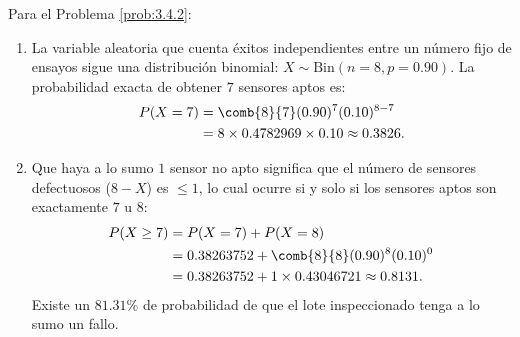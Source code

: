 \begin{solucion}
	\label{sol:3.4.2}
	Para el Problema \ref{prob:3.4.2}:
	\begin{enumerate}
		\item La variable aleatoria que cuenta éxitos independientes entre un número fijo de ensayos sigue una distribución binomial: $X \sim \text{Bin}(n=8, p=0.90)$. La probabilidad exacta de obtener $7$ sensores aptos es:
		\begin{align*}
			P(X = 7) &= \comb{8}{7} (0.90)^7 (0.10)^{8-7} \\
			&= 8 \times 0.4782969 \times 0.10 \approx 0.3826.
		\end{align*}
		\item Que haya a lo sumo $1$ sensor no apto significa que el número de sensores defectuosos ($8-X$) es $\le 1$, lo cual ocurre si y solo si los sensores aptos son exactamente $7$ u $8$:
		\begin{align*}
			P(X \ge 7) &= P(X = 7) + P(X = 8) \\
			&= 0.38263752 + \comb{8}{8} (0.90)^8 (0.10)^0 \\
			&= 0.38263752 + 1 \times 0.43046721 \approx 0.8131.
		\end{align*}
		Existe un $81.31\%$ de probabilidad de que el lote inspeccionado tenga a lo sumo un fallo.
	\end{enumerate}
\end{solucion}

